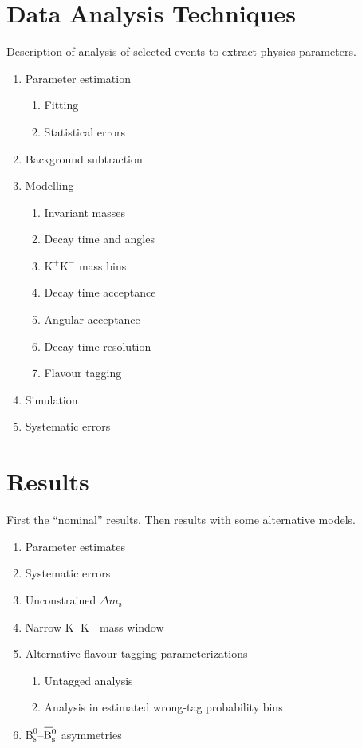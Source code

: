 \documentclass[a4paper,11pt]{article}
\newcommand{\Bs}{\text{B}_\text{s}^0}
\newcommand{\Bsbar}{\kern 0.06em \overline{\kern -0.06em \Bs \kern -0.32em} \kern 0.32em}
\newcommand{\KK}{\text{K}^+\text{K}^-}
\newcommand{\Delm}{\Delta m_\text{s}}
\begin{document}
\newpage

\section{Data Analysis Techniques}
  Description of analysis of selected events to extract physics parameters.
  \begin{enumerate}
    \item Parameter estimation
      \begin{enumerate}
        \item Fitting
        \item Statistical errors
      \end{enumerate}
    \item Background subtraction
    \item Modelling
      \begin{enumerate}
        \item Invariant masses
        \item Decay time and angles
        \item $\KK$ mass bins
        \item Decay time acceptance
        \item Angular acceptance
        \item Decay time resolution
        \item Flavour tagging
      \end{enumerate}
    \item Simulation
    \item Systematic errors
  \end{enumerate}

\section{Results}
  First the ``nominal'' results. Then results with some alternative models.
  \begin{enumerate}
    \item Parameter estimates
    \item Systematic errors
    \item Unconstrained $\Delm$
    \item Narrow $\KK$ mass window
    \item Alternative flavour tagging parameterizations
      \begin{enumerate}
        \item Untagged analysis
        \item Analysis in estimated wrong-tag probability bins
      \end{enumerate}
    \item $\Bs$--$\Bsbar$ asymmetries
  \end{enumerate}
\end{document}
